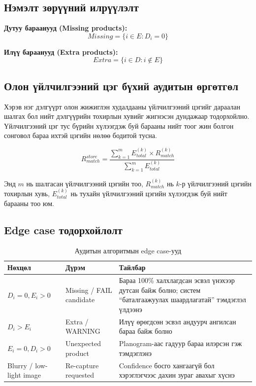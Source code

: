 \subsection{Нэмэлт зөрүүний илрүүлэлт}

\textbf{Дутуу бараанууд (Missing products):}
\begin{equation}
    Missing = \{i \in E : D_i = 0\}
\end{equation}

\textbf{Илүү бараанууд (Extra products):}
\begin{equation}
    Extra = \{i \in D : i \notin E\}
\end{equation}

\subsection{Олон үйлчилгээний цэг бүхий аудитын өргөтгөл}

Хэрэв нэг дэлгүүрт олон жижиглэн худалдааны үйлчилгээний цэгийг дараалан шалгах бол нийт дэлгүүрийн тохирлын хувийг жигнэсэн дундажаар тодорхойлно. Үйлчилгээний цэг тус бүрийн хүлээгдэж буй барааны нийт тоог жин болгон сонговол бараа ихтэй цэгийн нөлөө бодитой тусна.

\begin{equation}
    R^{store}_{match} = \frac{\sum_{k=1}^{m} E^{(k)}_{total} \times R^{(k)}_{match}}{\sum_{k=1}^{m} E^{(k)}_{total}}
\end{equation}

Энд \(m\) нь шалгасан үйлчилгээний цэгийн тоо, \(R^{(k)}_{match}\) нь \(k\)-р үйлчилгээний цэгийн тохирлын хувь, \(E^{(k)}_{total}\) нь тухайн үйлчилгээний цэгийн хүлээгдэж буй нийт барааны тоо юм.

\subsection{Edge case тодорхойлолт}

\begin{longtable}{|p{3.8cm}|p{3.2cm}|p{4.8cm}|}
\caption{Аудитын алгоритмын edge case-ууд}
\label{tab:audit_edge_cases} \\
\hline
\textbf{Нөхцөл} & \textbf{Дүрэм} & \textbf{Тайлбар} \\
\hline
\(D_i = 0, E_i > 0\) & Missing / FAIL candidate & Бараа 100\% халхлагдсан эсвэл үнэхээр дутсан байж болно; систем ``баталгаажуулах шаардлагатай'' тэмдэглэл үлдээнэ \\
\hline
\(D_i > E_i\) & Extra / WARNING & Илүү өрөгдсөн эсвэл андуурч ангилсан бараа байж болно \\
\hline
\(E_i = 0, D_i > 0\) & Unexpected product & Planogram-аас гадуур бараа илэрсэн гэж тэмдэглэнэ \\
\hline
Blurry / low-light image & Re-capture requested & Confidence босго хангаагүй бол хэрэглэгчээс дахин зураг авахыг хүснэ \\
\hline
\end{longtable}

